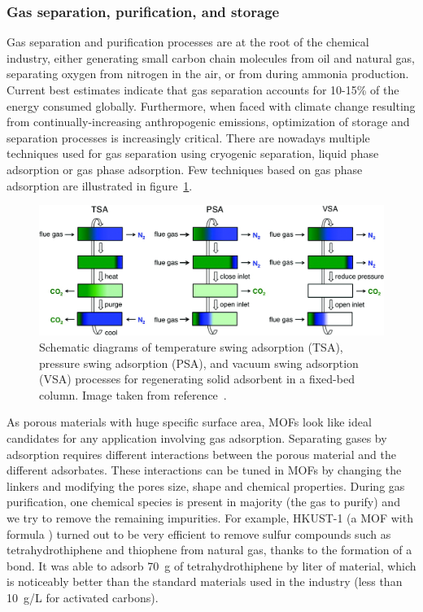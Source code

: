 \documentclass[thesis]{subfiles}
\begin{document}
\subsubsection{Gas separation, purification, and storage}

Gas separation and purification processes are at the root of the chemical
industry, either generating small carbon chain molecules from oil and natural
gas, separating oxygen from nitrogen in the air, or  from  during
ammonia production. Current best estimates indicate that gas separation accounts
for 10-15\% of the energy consumed globally\cite{Sholl2016}. Furthermore, when
faced with climate change resulting from continually-increasing anthropogenic
 emissions, optimization of storage and separation processes is
increasingly critical. There are nowadays multiple techniques used for gas
separation using cryogenic separation, liquid phase adsorption or gas phase
adsorption. Few techniques based on gas phase adsorption are illustrated in
figure~\ref{fig:adsorption-processes}.

\begin{figure}[ht]
    \centering
    \includegraphics[width=\textwidth]{figures/cited/adsorption-processes}
    \caption{Schematic diagrams of temperature swing adsorption (TSA),
    pressure swing adsorption (PSA), and vacuum swing adsorption (VSA)
    processes for regenerating solid adsorbent in a fixed-bed column.
    Image taken from reference~\cite{Sumida2011}.}
    \label{fig:adsorption-processes}
\end{figure}

As porous materials with huge specific surface area, MOFs look like ideal
candidates for any application involving gas adsorption. Separating gases by
adsorption requires different interactions between the porous material and the
different adsorbates. These interactions can be tuned in MOFs by changing the
linkers and modifying the pores size, shape and chemical properties. During gas
purification, one chemical species is present in majority (the gas to purify) and
we try to remove the remaining impurities. For example, HKUST-1 (a MOF with
formula ) turned out to be very efficient to remove sulfur
compounds such as tetrahydrothiphene and thiophene from natural gas, thanks to
the formation of a  bond\cite{Mueller2006}. It was able to adsorb
\SI{70}{g} of tetrahydrothiphene by liter of material, which is noticeably
better than the standard materials used in the industry (less than \SI{10}{g/L}
for activated carbons).
\end{document}
